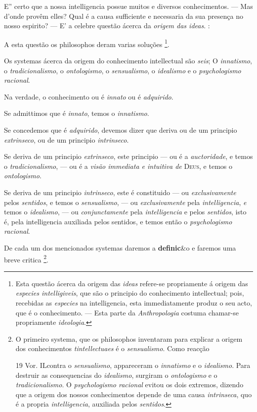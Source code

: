
E” certo que a nossa intelligencia possue muitos e diversos conhecimentos. --- Mas d'onde provêm elles? Qual é a causa sufficiente e necessaria da sua presença no nosso espirito? --- E' a celebre questão ácerca da \emph{origem das ideas}. :

A esta questão os philosophos deram varias soluções \footnote{Esta questão ácerca da origem das \emph{ideas} refere-se propriamente á origem das \emph{especies intelligiveis}, que são o principio do conhecimento intellectual; pois, recebidas as \emph{especies} na intelligencia, esta immediatamente produz o seu acto, que é o conhecimento. --- Esta parte da \emph{Anthropologia} costuma chamar-se propriamente \emph{ideologia}.}.


Os systemas ácerca da origem do conhecimento intellectual são \emph{seis}; O \emph{innatismo}, o \emph{tradicionalismo}, o \emph{ontologismo}, o \emph{sensualismo}, o \emph{idealismo} e o \emph{psychologismo racional}.

Na verdade, o conhecimento ou é \emph{innato} ou é \emph{adquirido}.

Se admittimos que é \emph{innato}, temos o \emph{innatismo}.

Se concedemos que é \emph{adquirido}, devemos dizer que deriva ou de um principio \emph{extrinseco}, ou de um principio \emph{intrinseco}.

Se deriva de um principio \emph{extrinseco}, este principio --- ou é a \emph{auctoridade}, e temos o \emph{tradicionalismo}, --- ou é a \emph{visão immediata e intuitiva de} \textsc{Deus}, e temos o \emph{ontologismo}.

Se deriva de um principio \emph{intrinseco}, este é constituido --- ou \emph{exclusivamente} pelos \emph{sentidos}, e temos o \emph{sensualismo}, --- ou \emph{exclusivamente} pela \emph{intelligencia}, \emph{e} temos o \emph{idealismo}, --- ou \emph{conjunctamente} pela \emph{intelligencia} e pelos \emph{sentidos}, isto é, pela intelligencia auxiliada pelos sentidos, e temos então o \emph{psychologismo racional}.

De cada um dos mencionados systemas daremos a \textbf{definic}\&o e faremos uma breve critica \footnote{O primeiro systema, que os philosophos inventaram para explicar a origem dos conhecimentos \emph{tintellectuaes} é o \emph{sensualismo}. Como reacção\par 19 Vor. ILcontra o \emph{sensualismo}, appareceram o \emph{innatismo} e o \emph{idealismo}. Para destruir as consequencias do \emph{idealismo}, surgiram o \emph{ontologismo} e o \emph{tradicionalismo}. O \emph{psychologismo racional} evitou os dois extremos, dizendo que a origem dos nossos conhecimentos depende de uma causa \emph{intrinseca}, quo é a propria \emph{intelligencia}, auxiliada pelos \emph{sentidos}.}.


